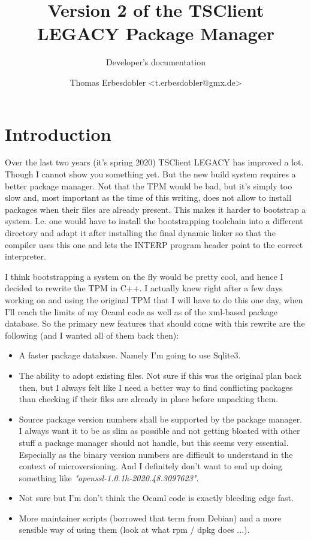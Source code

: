 \documentclass[a4paper]{scrartcl}
\title{Version 2 of the TSClient LEGACY Package Manager}
\subtitle{Developer's documentation}
\author{Thomas Erbesdobler <t.erbesdobler@gmx.de>}
\begin{document}
	\maketitle
	\tableofcontents
	
	
	\section{Introduction}
	\label{sec:introduction}
	
	Over the last two years (it's spring 2020) TSClient LEGACY has improved a lot. Though I cannot show you something yet. But the new build system requires a better package manager. Not that the TPM would be bad, but it's simply too slow and, most important as the time of this writing, does not allow to install packages when their files are already present. This makes it harder to bootstrap a system. I.e. one would have to install the bootstrapping toolchain into a different directory and adapt it after installing the final dynamic linker so that the compiler uses this one and lets the INTERP program header point to the correct interpreter.
	
	I think bootstrapping a system on the fly would be pretty cool, and hence I decided to rewrite the TPM in C++. I actually knew right after a few days working on and using the original TPM that I will have to do this one day, when I'll reach the limits of my Ocaml code as well as of the xml-based package database. So the primary new features that should come with this rewrite are the following (and I wanted all of them back then):
	
	\begin{itemize}
		\item A faster package database. Namely I'm going to use Sqlite3.
		\item The ability to adopt existing files. Not sure if this was the original plan back then, but I always felt like I need a better way to find conflicting packages than checking if their files are already in place before unpacking them.
		\item Source package version numbers shall be supported by the package manager. I always want it to be as slim as possible and not getting bloated with other stuff a package manager should not handle, but this seems very essential. Especially as the binary version numbers are difficult to understand in the context of microversioning. And I definitely don't want to end up doing something like \textit{"openssl-1.0.1h-2020.48.3097623"}.
		\item Not sure but I'm don't think the Ocaml code is exactly bleeding edge fast.
		\item More maintainer scripts (borrowed that term from Debian) and a more sensible way of using them (look at what rpm / dpkg does ...).
	\end{itemize}
\end{document}
